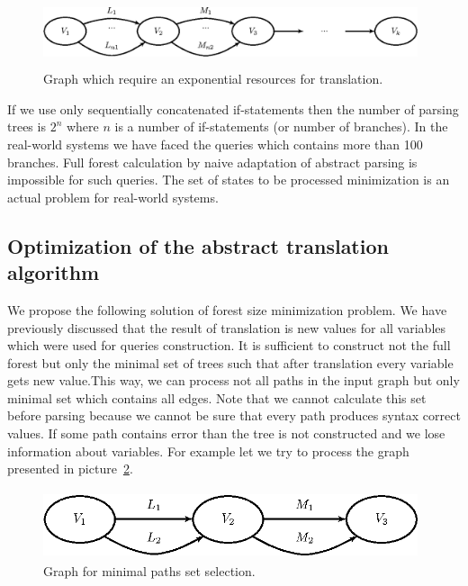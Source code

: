 \documentclass{llncs}
\begin{document}
\begin{figure}
    \begin{center}
        \includegraphics[width=11cm,height=2cm]{graphs/big_res.eps}
        \caption{Graph which require an exponential resources for translation.}
        \label{pic5}
    \end{center}
\end{figure}

If we use only sequentially concatenated if-statements then the number of parsing trees is $2^n$ where $n$ is a number of if-statements (or number of branches). In the real-world systems we have faced the queries which contains more than 100 branches. Full forest calculation by naive adaptation of abstract parsing is impossible for such queries. The set of states to be processed minimization is an actual problem for real-world systems.


\subsection{Optimization of the abstract translation algorithm}
\label{sec:Optimizations}

We propose the following solution of forest size minimization problem. We have previously discussed that the result of translation is new values for all variables which were used for queries construction. It is sufficient to construct not the full forest but only the minimal set of trees such that after translation every variable gets new value.This way, we can process not all paths in the input graph but only minimal set which contains all edges. Note that we cannot calculate this set before parsing because we cannot be sure that every path produces syntax correct values. If some path contains error than the tree is not constructed and we lose information about variables. For example let we try to process the graph presented in picture~\ref{pic6}.

\begin{figure}
    \begin{center}
        \includegraphics[width=11cm,height=2cm]{graphs/paths.eps}
        \caption{Graph for minimal paths set selection.}
        \label{pic6}
    \end{center}
\end{figure}
\end{document}
